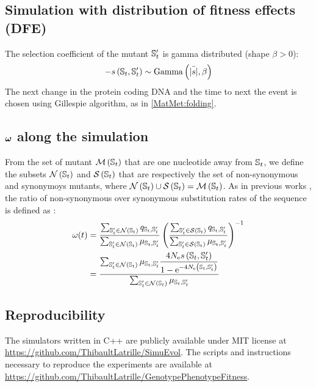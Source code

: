 \documentclass{article}
\begin{document}
\subsection*{Simulation with distribution of fitness effects (DFE)}
The selection coefficient of the mutant $\mathbb{S}_{t}'$ is gamma distributed (shape $\beta > 0$):
\begin{equation}
- s \left( \mathbb{S}_{t},\mathbb{S}_{t}'\right) \sim \text{Gamma} \left( \bar{|s|}, \beta \right)
\end{equation}
The next change in the protein coding DNA and the time to next the event is chosen using Gillespie algorithm, as in \ref{MatMet:folding}.

\subsection*{$\bm{\omega}$ along the simulation}
From the set of mutant $\mathcal{M}\left(\mathbb{S}_{t}\right)$ that are one nucleotide away from $\mathbb{S}_{t}$, we define the subsets $\mathcal{N}\left(\mathbb{S}_{t}\right)$ and $\mathcal{S}\left(\mathbb{S}_{t}\right)$ that are respectively the set of non-synonymous and synonymoys mutants, where  $\mathcal{N}\left(\mathbb{S}_{t}\right) \cup \mathcal{S}\left(\mathbb{S}_{t}\right) = \mathcal{M}\left(\mathbb{S}_{t}\right)$.
As in previous works \cite{Spielman2015a, DosReis2015, Jones2016}, the ratio of non-synonymous over synonymous substitution rates of the sequence is defined as :
\begin{align}
\omega(t) &= \dfrac{\sum_{\mathbb{S}_{t}' \in \mathcal{N}\left(\mathbb{S}_{t}\right)} q_{\mathbb{S}_{t}, \mathbb{S}_{t}'}}{\sum_{\mathbb{S}_{t}' \in \mathcal{N}\left(\mathbb{S}_{t}\right)} \mu_{\mathbb{S}_{t}, \mathbb{S}_{t}'}} \left( \dfrac{\sum_{\mathbb{S}_{t}' \in \mathcal{S}\left(\mathbb{S}_{t}\right)} q_{\mathbb{S}_{t}, \mathbb{S}_{t}'}}{\sum_{\mathbb{S}_{t}' \in \mathcal{S}\left(\mathbb{S}_{t}\right)} \mu_{\mathbb{S}_{t}, \mathbb{S}_{t}'}} \right)^{-1}\\
 &= \dfrac{\sum_{\mathbb{S}_{t}' \in \mathcal{N}\left(\mathbb{S}_{t}\right)} \mu_{\mathbb{S}_{t}, \mathbb{S}_{t}'} \dfrac{4 N_{\mathrm{e}} s \left( \mathbb{S}_{t},\mathbb{S}_{t}'\right)}{{1 - \mathrm{e}^{-4 N_{\mathrm{e}} \left( \mathbb{S}_{t},\mathbb{S}_{t}'\right)} }}}{\sum_{\mathbb{S}_{t}' \in \mathcal{N}\left(\mathbb{S}_{t}\right)} \mu_{\mathbb{S}_{t}, \mathbb{S}_{t}'}} 
\end{align}
\subsection*{Reproducibility}
The simulators written in C++ are publicly available under MIT license at \url{https://github.com/ThibaultLatrille/SimuEvol}.
The scripts and instructions necessary to reproduce the experiments are available at \url{https://github.com/ThibaultLatrille/GenotypePhenotypeFitness}.



\end{document}
